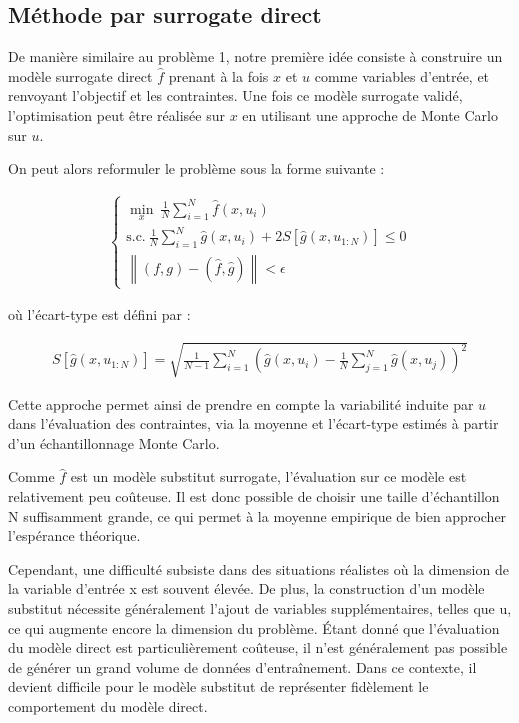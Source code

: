 \documentclass[a4paper, 11pt]{article}
\begin{document}

\subsection{Méthode par surrogate direct}

De manière similaire au problème 1, notre première idée consiste à construire un modèle surrogate direct $\hat{f}$ prenant à la fois $x$ et $u$ comme variables d’entrée, et renvoyant l’objectif et les contraintes. Une fois ce modèle surrogate validé, l’optimisation peut être réalisée sur $x$ en utilisant une approche de Monte Carlo sur $u$.

On peut alors reformuler le problème sous la forme suivante :

\begin{align*}
    \begin{cases}
        \displaystyle \min_{x} \ \frac{1}{N} \sum_{i=1}^{N} \hat{f}(x, u_i) \\
        \text{s.c.} \ \displaystyle \frac{1}{N} \sum_{i=1}^{N} \hat{g}(x, u_i) + 2 S[\hat{g}(x, u_{1:N})] \leq 0 \\
        \left\| (f, g) - (\hat{f}, \hat{g}) \right\| < \epsilon
    \end{cases}
\end{align*}

où l’écart-type est défini par :

\begin{align*}
    S[\hat{g}(x, u_{1:N})] = \sqrt{ \frac{1}{N-1} \sum_{i=1}^{N} \left( \hat{g}(x, u_i) - \frac{1}{N} \sum_{j=1}^{N} \hat{g}(x, u_j) \right)^2 }
\end{align*}

Cette approche permet ainsi de prendre en compte la variabilité induite par $u$ dans l’évaluation des contraintes, via la moyenne et l’écart-type estimés à partir d’un échantillonnage Monte Carlo.

Comme $\hat{f}$ est un modèle substitut surrogate, l’évaluation sur ce modèle est relativement peu coûteuse. Il est donc possible de choisir une taille d’échantillon N suffisamment grande, ce qui permet à la moyenne empirique de bien approcher l’espérance théorique.

Cependant, une difficulté subsiste dans des situations réalistes où la dimension de la variable d’entrée x est souvent élevée. De plus, la construction d’un modèle substitut nécessite généralement l’ajout de variables supplémentaires, telles que u, ce qui augmente encore la dimension du problème. Étant donné que l’évaluation du modèle direct est particulièrement coûteuse, il n’est généralement pas possible de générer un grand volume de données d’entraînement. Dans ce contexte, il devient difficile pour le modèle substitut de représenter fidèlement le comportement du modèle direct.
\end{document}
